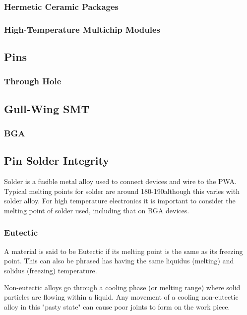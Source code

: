 \documentclass{article}
\begin{document}
		\subsubsection{Hermetic Ceramic Packages}
		\subsubsection{High-Temperature Multichip Modules}
	
	\subsection{Pins}
		\subsubsection{Through Hole}
		\subsection{Gull-Wing SMT}
		\subsubsection{BGA}
	
	\subsection{Pin Solder Integrity}
		Solder is a fusible metal alloy used to connect devices and wire to the PWA.
		Typical melting points for solder are around 180-190\degree although this varies with solder alloy. 
		For high temperature electronics it is important to consider the melting point of solder used, including that on BGA devices.
		\subsubsection{Eutectic}
		A material is said to be Eutectic if its melting point is the same as its freezing point. 
		This can also be phrased has having the same liquidus (melting) and solidus (freezing) temperature.
		
		Non-eutectic alloys go through a cooling phase (or melting range) where solid particles are flowing within a liquid. Any movement of a cooling non-eutectic alloy in this "pasty state" can cause poor joints to form on the work piece.  		
\end{document}
